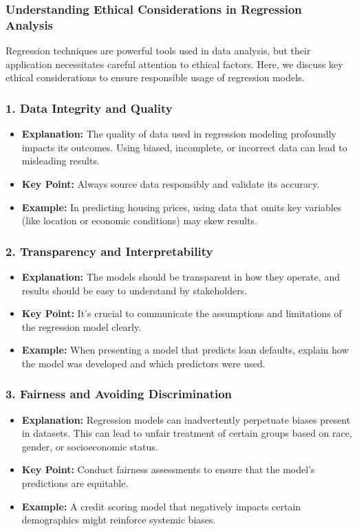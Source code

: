 \documentclass[aspectratio=169]{beamer}
\begin{document}
\begin{frame}[fragile]
    \frametitle{Understanding Ethical Considerations in Regression Analysis}
    Regression techniques are powerful tools used in data analysis, but their application necessitates careful attention to ethical factors. Here, we discuss key ethical considerations to ensure responsible usage of regression models.
\end{frame}

\begin{frame}[fragile]
    \frametitle{1. Data Integrity and Quality}
    \begin{itemize}
        \item \textbf{Explanation:} The quality of data used in regression modeling profoundly impacts its outcomes. Using biased, incomplete, or incorrect data can lead to misleading results.
        \item \textbf{Key Point:} Always source data responsibly and validate its accuracy.
        \item \textbf{Example:} In predicting housing prices, using data that omits key variables (like location or economic conditions) may skew results.
    \end{itemize}
\end{frame}

\begin{frame}[fragile]
    \frametitle{2. Transparency and Interpretability}
    \begin{itemize}
        \item \textbf{Explanation:} The models should be transparent in how they operate, and results should be easy to understand by stakeholders.
        \item \textbf{Key Point:} It’s crucial to communicate the assumptions and limitations of the regression model clearly.
        \item \textbf{Example:} When presenting a model that predicts loan defaults, explain how the model was developed and which predictors were used.
    \end{itemize}
\end{frame}

\begin{frame}[fragile]
    \frametitle{3. Fairness and Avoiding Discrimination}
    \begin{itemize}
        \item \textbf{Explanation:} Regression models can inadvertently perpetuate biases present in datasets. This can lead to unfair treatment of certain groups based on race, gender, or socioeconomic status.
        \item \textbf{Key Point:} Conduct fairness assessments to ensure that the model's predictions are equitable.
        \item \textbf{Example:} A credit scoring model that negatively impacts certain demographics might reinforce systemic biases.
    \end{itemize}
\end{frame}
\end{document}
